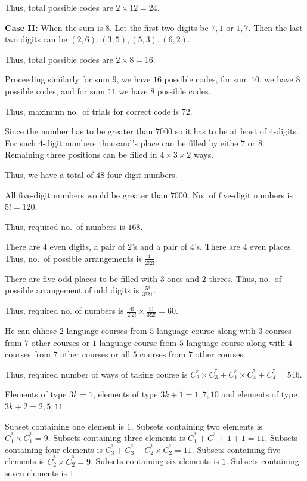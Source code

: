   Thus, total possible codes are $2\times 12 = 24$.

  {\bf Case II:} When the sum is $8$. Let the first two digits be $7, 1$ or $1, 7$. Then the last two digits
  can be $(2, 6), (3, 5), (5, 3), (6, 2)$.

  Thus, total possible codes are $2\times 8 = 16$.

  Proceeding similarly for sum $9$, we have $16$ possible codes, for sum $10$, we have $8$ possible codes,
  and for sum $11$ we have $8$ possible codes.

  Thus, maximum no.\ of trials for correct code is $72$.
\item Since the number has to be greater than $7000$ so it has to be at least of $4$-digits. For such
  $4$-digit numbers thousand's place can be filled by eithe $7$ or $8$. Remaining three positions can be
  filled in $4\times3\times2$ ways.

  Thus, we have a total of $48$ four-digit numbers.

  All five-digit numbers would be greater than $7000$. No.\ of five-digit numbers is $5! = 120$.

  Thus, required no.\ of numbers is $168$.
\item There are $4$ even digits, a pair of $2$'s and a pair of $4$'s. There are $4$ even places. Thus,
  no.\ of possible arrangements is $\frac{4!}{2!2!}$.

  There are five odd places to be filled with $3$ ones and $2$ threes. Thus, no.\ of possible arrangement of
  odd digits is $\frac{5!}{3!21}$.

  Thus, required no. of numbers is $\frac{4!}{2!2!}\times\frac{5!}{3!2!} = 60$.
\item He can chhose $2$ language courses from $5$ language course along with $3$ courses from $7$ other
  courses or $1$ language course from $5$ language course along with $4$ courses from $7$ other courses or
  all $5$ courses from $7$ other courses.

  Thus, required number of ways of taking course is $C_2^^5\times C_3^^7 + C_1^^5\times C_4^^7 + C_4^^7 =
  546$.
\item Elements of type $3k = 1$, elements of type $3k + 1 = 1, 7, 10$ and elements of type $3k + 2 = 2, 5,
  11$.

  Subset containing one element is $1$. Subsets containing two elements is $C_1^^3\times C_1^^3 =
  9$. Subsets containing three elements is $C_1^^3 + C_1^^3 + 1 + 1 = 11$. Subsets containing four elements
  is $C_3^^3 + C_3^^3 + C_2^^3\times C_2^^3 = 11$. Subsets containing five elements is $C_2^^3\times C_2^^3
  = 9$. Subsets containing six elements is $1$. Subsets containing seven elements is $1$.

